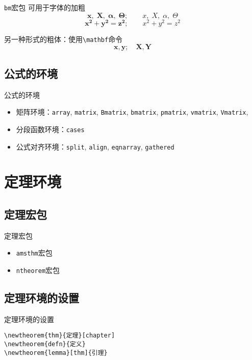 \documentclass[t]{beamer}
\begin{document}
\begin{frame}[fragile]{\texttt{bm}宏包}
可用于字体的加粗
$$\bm{x, \; X,\; \alpha, \; \Theta};\qquad x, \; X,\; \alpha, \; \Theta$$
$$\bm{x^2+y^2=z^2};\qquad x^2+y^2=z^2$$

另一种形式的粗体：使用\verb"\mathbf"命令
$$\mathbf{x,y}; \quad \mathbf{X,Y}$$
\end{frame}


\subsection{公式的环境}
\begin{frame}{公式的环境}
\begin{itemize}
\item 矩阵环境：\texttt{array}, \texttt{matrix}, \texttt{Bmatrix}, \texttt{bmatrix}, \texttt{pmatrix},   \texttt{vmatrix},  \texttt{Vmatrix},
\item 分段函数环境：\texttt{cases}
\item 公式对齐环境：\texttt{split}, \texttt{align},  \texttt{eqnarray}, \texttt{gathered}
\end{itemize}
\end{frame}


\section{定理环境}
\subsection{定理宏包}
\begin{frame}{定理宏包}
\begin{itemize}
\item \texttt{amsthm}宏包
\item \texttt{ntheorem}宏包

\end{itemize}
\end{frame}



\subsection{定理环境的设置}
\begin{frame}[fragile]{定理环境的设置}
\begin{verbatim}
\newtheorem{thm}{定理}[chapter]
\newtheorem{defn}{定义}
\newtheorem{lemma}[thm]{引理}
\end{verbatim}
\end{frame}
\end{document}
